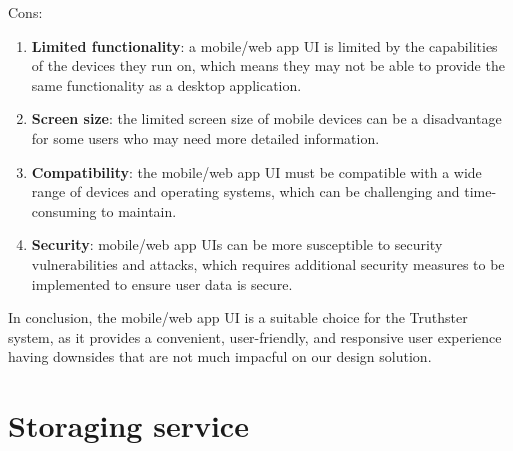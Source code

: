 \documentclass[target=mst,aauheader=]{thud}
\begin{document}
Cons:

\begin{enumerate}
    
    \item \textbf{Limited functionality}: a mobile/web app UI is limited by the capabilities of the devices they run on, which means they may not be able to provide the same functionality as a desktop application.
    \item \textbf{Screen size}: the limited screen size of mobile devices can be a disadvantage for some users who may need more detailed information.
    \item \textbf{Compatibility}: the mobile/web app UI must be compatible with a wide range of devices and operating systems, which can be challenging and time-consuming to maintain.
    \item \textbf{Security}: mobile/web app UIs can be more susceptible to security vulnerabilities and attacks, which requires additional security measures to be implemented to ensure user data is secure.

\end{enumerate}

In conclusion, the mobile/web app UI is a suitable choice for the Truthster system, as it provides a convenient, user-friendly, and responsive user experience having downsides that are not much impacful on our design solution.

\section{Storaging service}
\end{document}
